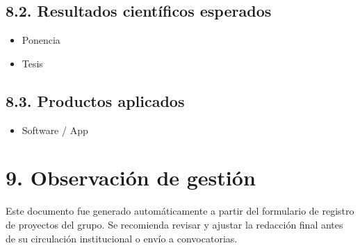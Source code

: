 \documentclass[a4paper,12pt]{article}
\begin{document}
\subsection*{8.2. Resultados científicos esperados}
\begin{itemize}
    \item Ponencia
    \item Tesis
\end{itemize}

\subsection*{8.3. Productos aplicados}
\begin{itemize}
    \item Software / App
\end{itemize}

\section*{9. Observación de gestión}
Este documento fue generado automáticamente a partir del formulario de registro de proyectos del grupo. Se recomienda revisar y ajustar la redacción final antes de su circulación institucional o envío a convocatorias.
\end{document}
